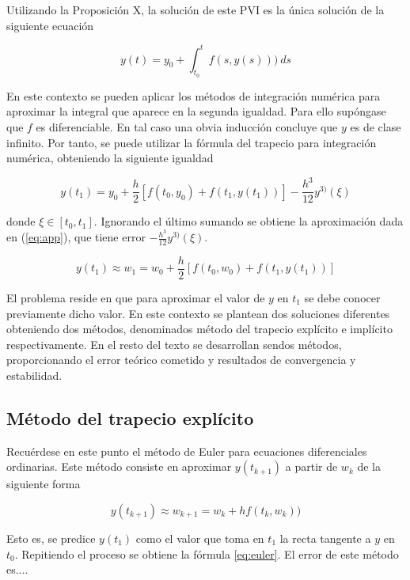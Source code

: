 \documentclass{article}
\theoremstyle{theorem-style}  %
\theoremstyle{definition}
\theoremstyle{example-style}
\begin{document}
	Utilizando la Proposición X, la solución de este PVI es la única solución de la siguiente ecuación
	
	\begin{equation}
		y(t)  = y_0 + \int_{t_0}^{t} f(s,y(s))) \ ds
	\end{equation}
	
	En este contexto se pueden aplicar los métodos de integración numérica para aproximar la integral que aparece en la segunda igualdad. Para ello supóngase que $f$ es diferenciable. En tal caso una obvia inducción concluye que $y$ es de clase infinito. Por tanto, se puede utilizar la fórmula del trapecio para integración numérica, obteniendo la siguiente igualdad
	
	\begin{equation}
		y(t_{1}) = y_0 + \frac{h}{2} \left[f(t_0,y_0) + f(t_1, y(t_1))\right] - \frac{h^3}{12}y^{3)}(\xi)
	\end{equation}


	donde $\xi \in [t_0, t_1]$. Ignorando el último sumando se obtiene la aproximación dada en (\ref{eq:app}), que tiene error $- \frac{h^3}{12}y^{3)}(\xi)$.

	\begin{equation} \label{eq:app}
		y(t_1) \approx w_1 = w_0 + \frac{h}{2} \left[f(t_0,w_0) + f(t_1, y(t_1))\right]
	\end{equation}

	El problema reside en que para aproximar el valor de $y$ en $t_1$ se debe conocer previamente dicho valor. En este contexto se plantean dos soluciones diferentes obteniendo dos métodos, denominados método del trapecio explícito e implícito respectivamente. En el resto del texto se desarrollan sendos métodos, proporcionando el error teórico cometido y resultados de convergencia y estabilidad.
	
	\subsection{Método del trapecio explícito}
		
		Recuérdese en este punto el método de Euler para ecuaciones diferenciales ordinarias. Este método consiste en aproximar $y(t_{k+1})$ a partir de $w_k$ de la siguiente forma
		
		\begin{equation} \label{eq:euler}
			y(t_{k+1}) \approx w_{k+1} = w_k + h f(t_k,w_k))
		\end{equation}

		Esto es, se predice $y(t_{1})$ como el valor que toma en $t_1$ la recta tangente a $y$ en $t_0$. Repitiendo el proceso se obtiene la fórmula \ref{eq:euler}. El error de este método es....
\end{document}
